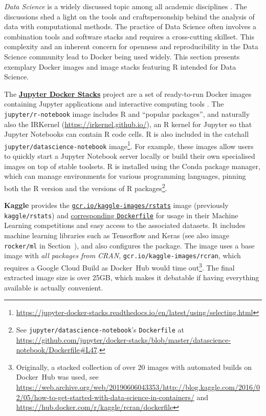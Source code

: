 \label{datascience}

\emph{Data Science} is a widely discussed topic among all academic
disciplines \citep[e.g.,][]{donoho_50_2017}. The discussions shed a
light on the tools and craftspersonship behind the analysis of data with
computational methods. The practice of Data Science often involves a
combination tools and software stacks and requires a cross-cutting
skillset. This complexity and an inherent concern for openness and
reproducibility in the Data Science community lead to Docker being used
widely. This section presents exemplary Docker images and image stacks
featuring R intended for Data Science.

The \href{https://github.com/jupyter/docker-stacks/}{\textbf{Jupyter
Docker Stacks}} project are a set of ready-to-run Docker images
containing Jupyter applications and interactive computing tools
\citep{project_jupyter_jupyter_2018}. The \texttt{jupyter/r-notebook}
image includes R and ``popular packages'', and naturally also the
IRKernel (\url{https://irkernel.github.io/}), an R kernel for Jupyter so
that Jupyter Notebooks can contain R code cells. R is also included in
the catchall \texttt{jupyter/datascience-notebook}
image\footnote{\href{https://jupyter-docker-stacks.readthedocs.io/en/latest/using/selecting.html}{https://jupyter-docker-stacks.readthedocs.io/en/latest/using/selecting.html}}.
For example, these images allow users to quickly start a Jupyter
Notebook server locally or build their own specialised images on top of
stable toolsets. R is installed using the Conda package manager, which
can manage environments for various programming languages, pinning both
the R version and the versions of R
packages\footnote{See \texttt{jupyter/datascience-notebook}'s \texttt{Dockerfile} at \href{https://github.com/jupyter/docker-stacks/blob/master/datascience-notebook/Dockerfile\#L47}{https://github.com/jupyter/docker-stacks/blob/master/datascience-notebook/Dockerfile\#L47}.}.

\textbf{Kaggle} provides the
\href{https://hub.docker.com/r/kaggle/rstats}{\texttt{gcr.io/kaggle-images/rstats}}
image (previously \texttt{kaggle/rstats}) and
\href{https://github.com/Kaggle/docker-rstats}{corresponding
\texttt{Dockerfile}} for usage in their Machine Learning competitions
and easy access to the associated datasets. It includes machine learning
libraries such as Tensorflow and Keras (see also image
\texttt{rocker/ml} in Section~), and also configures
the  package. The image uses a base image with
\emph{all packages from CRAN}, \texttt{gcr.io/kaggle-images/rcran},
which requires a Google Cloud Build as Docker~Hub would time
out\footnote{Originally, a stacked collection of over 20 images with automated builds on Docker~Hub was used, see \href{https://web.archive.org/web/20190606043353/http://blog.kaggle.com/2016/02/05/how-to-get-started-with-data-science-in-containers/}{https://web.archive.org/web/20190606043353/http://blog.kaggle.com/2016/02/05/how-to-get-started-with-data-science-in-containers/} and \href{https://hub.docker.com/r/kaggle/rcran/dockerfile}{https://hub.docker.com/r/kaggle/rcran/dockerfile}}.
The final extracted image size is over 25GB, which makes it debatable if
having everything available is actually convenient.

